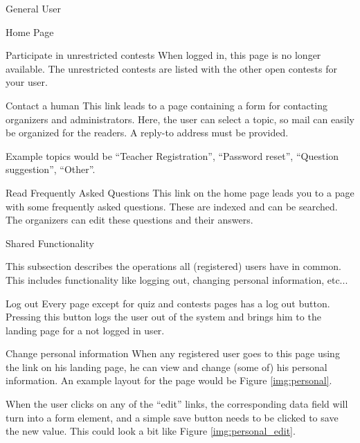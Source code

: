 \begin{section}{General User}
\begin{subsection}{Home Page}
\begin{subsubsection}{Participate in unrestricted contests}
            When logged in, this page is no longer available. The unrestricted
            contests are listed with the other open contests for your user.
        \end{subsubsection}

        \begin{subsubsection}{Contact a human}
            This link leads to a page containing a form for contacting organizers
            and administrators. Here, the user can select a topic, so mail can
            easily be organized for the readers. A reply-to address must be
            provided.

            Example topics would be ``Teacher Registration'', ``Password
            reset'', ``Question suggestion'', ``Other''.
        \end{subsubsection}

        \begin{subsubsection}{Read Frequently Asked Questions}
            This link on the home page leads you to a page with some frequently
            asked questions. These are indexed and can be searched. The
            organizers can edit these questions and their answers.
        \end{subsubsection}

    \end{subsection}

    \begin{subsection}{Shared Functionality}

        This subsection describes the operations all (registered) users have in
        common. This includes functionality like logging out, changing personal
        information, etc...

        \begin{subsubsection}{Log out}
            Every page except for quiz and contests pages has a log out button.
            Pressing this button logs the user out of the system and brings him
            to the landing page for a not logged in user.
        \end{subsubsection}

        \begin{subsubsection}{Change personal information}
            When any registered user goes to this page using the link on his
            landing page, he can view and change (some of) his personal
            information. An example layout for the page would be Figure
            \ref{img:personal}.

            When the user clicks on any of the ``edit'' links, the corresponding
            data field will turn into a form element, and a simple save button
            needs to be clicked to save the new value. This could look a bit
            like Figure \ref{img:personal_edit}.


\end{subsubsection}
\end{subsection}
\end{section}
